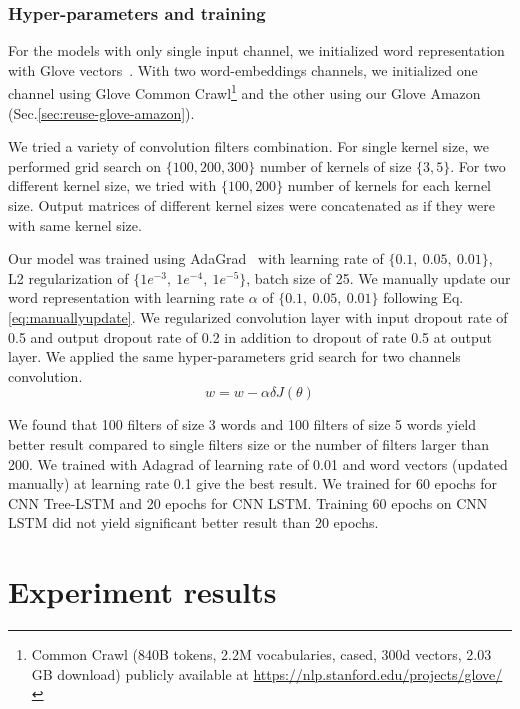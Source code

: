 \subsubsection{Hyper-parameters and training}
For the models with only single input channel, we initialized word representation with Glove vectors~\cite{glove}.
With two word-embeddings channels, we initialized one channel using Glove Common Crawl\footnote{\label{glovecommoncrawl}Common Crawl (840B tokens, 2.2M vocabularies, cased, 300d vectors, 2.03 GB download) publicly available at \url{https://nlp.stanford.edu/projects/glove/}} and the other using our Glove Amazon (Sec.\ref{sec:reuse-glove-amazon}).

We tried a variety of convolution filters combination.
For single kernel size, we performed grid search on $\{100, 200, 300\}$ number of kernels of size $\{3, 5\}$.
For two different kernel size, we tried with $\{100, 200\}$ number of kernels for each kernel size.
Output matrices of different kernel sizes were concatenated as if they were with same kernel size.

Our model was trained using AdaGrad~\cite{duchi2011adaptive} with learning rate of $\{0.1,~ 0.05,~ 0.01\}$, L2 regularization of $\{1e^{-3},~ 1e^{-4}, ~ 1e^{-5} \}$, batch size of 25.
We manually update our word representation with learning rate $\alpha$ of $\{0.1,~0.05, ~0.01\}$ following Eq.\ref{eq:manuallyupdate}.
We regularized convolution layer with input dropout rate of 0.5 and output dropout rate of 0.2 in addition to dropout of rate 0.5 at output layer.
We applied the same hyper-parameters grid search for two channels convolution.
\begin{equation}
\label{eq:manuallyupdate}
w = w - \alpha\delta J(\theta)
\end{equation}

We found that 100 filters of size 3 words and 100 filters of size 5 words yield better result compared to single filters size or the number of filters larger than 200. We trained with Adagrad of learning rate of 0.01 and word vectors (updated manually) at learning rate 0.1 give the best result. We trained for 60 epochs for CNN Tree-LSTM and 20 epochs for CNN LSTM. Training 60 epochs on CNN LSTM did not yield significant better result than 20 epochs.

\section{Experiment results}

